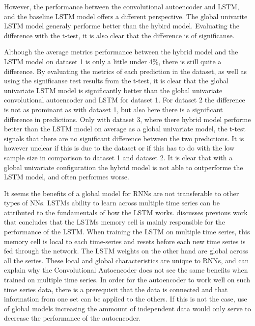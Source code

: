 However, the performance between the convolutional autoencoder and LSTM, and the baseline LSTM model offers a different perspective.
The global univarite LSTM model generaly performe better than the hybird model.
Evaluating the difference with the t-test, it is also clear that the difference is of significanse.

Although the average metrics performance between the hybrid model and the LSTM model on dataset 1 is only a little under 4\%,
there is still quite a difference.
By evaluating the metrics of each prediction in the dataset, as well as using the significanse test results from the t-test,
it is clear that the global univariate LSTM model is significantly better than the global univariate convolutional autoencoder and LSTM for dataset 1.
For dataset 2 the difference is not as prominant as with dataset 1, but also here there is a significant difference in predictions.
Only with dataset 3, where there hybrid model performe better than the LSTM model on average as a global univariate model,
the t-test signals that there are no significant difference between the two predictions.
It is however unclear if this is due to the dataset or if this has to do with the low sample size in comparison to dataset 1 and dataset 2.
It is clear that with a global univariate configuration the hybrid model is not able to outperforme the LSTM model,
and often performes worse. 


It seems the benefits of a global model for RNNs are not transferable to other types
of NNs. LSTMs ability to learn across multiple time series can be attributed to the fundamentals
of how the LSTM works. \cite{Zhao2019} discusses previous work that concludes that
the LSTMs memory cell is mainly responsible for the performance of the LSTM.
When training the LSTM on multiple time series, this memory cell is local to each
time-series and resets before each new time series is fed through the network.
The LSTM weights on the other hand are global across all the series.
These local and global characteristics are unique to RNNs, and can explain
why the Convolutional Autoencoder does not see the same benefits when trained on multiple
time series.
In order for the autoencoder to work well on such time series data,
there is a prerequisit that the data is connected and that information from one set can be applied to the others.
If this is not the case, use of global models increasing the ammount of independent data would only serve to decrease the performance of the autoencoder.


